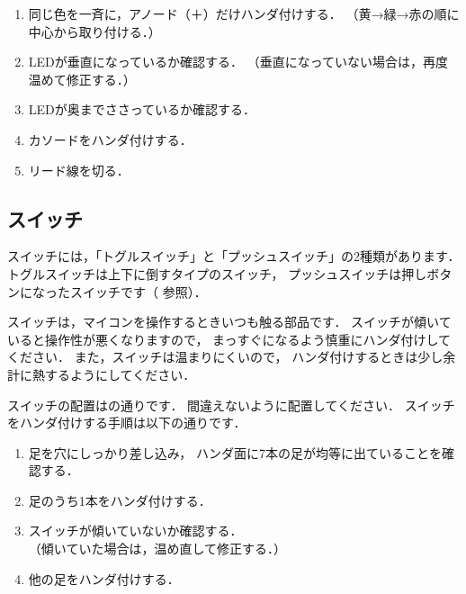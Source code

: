 \begin{enumerate}
\item 同じ色を一斉に，アノード（＋）だけハンダ付けする．
  （黄→緑→赤の順に中心から取り付ける．）
\item LEDが垂直になっているか確認する．
  （垂直になっていない場合は，再度温めて修正する．）
\item LEDが奥までささっているか確認する．
\item カソードをハンダ付けする．
\item リード線を切る．
\end{enumerate}


\subsection{スイッチ}


スイッチには，「トグルスイッチ」と「プッシュスイッチ」の2種類があります．
トグルスイッチは上下に倒すタイプのスイッチ，
プッシュスイッチは押しボタンになったスイッチです（ 参照）．



スイッチは，マイコンを操作するときいつも触る部品です．
スイッチが傾いていると操作性が悪くなりますので，
まっすぐになるよう慎重にハンダ付けしてください．
また，スイッチは温まりにくいので，
ハンダ付けするときは少し余計に熱するようにしてください．

スイッチの配置はの通りです．
間違えないように配置してください．
スイッチをハンダ付けする手順は以下の通りです．

\begin{enumerate}
\item 足を穴にしっかり差し込み，
  ハンダ面に7本の足が均等に出ていることを確認する．
\item 足のうち1本をハンダ付けする．
\item スイッチが傾いていないか確認する．\\
  （傾いていた場合は，温め直して修正する．）
\item 他の足をハンダ付けする．
\end{enumerate}

